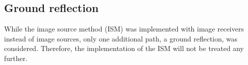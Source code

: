 %
%
%
%
%
%

\newpage
\subsection{Ground reflection} %
While the image source method (ISM) was implemented with image
receivers instead of image sources, only one additional path,
a ground reflection, was considered. Therefore, the implementation of the ISM
will not be treated any further.

